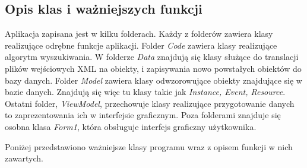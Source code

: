 \subsection{Opis klas i ważniejszych funkcji}

Aplikacja zapisana jest w kilku folderach. Każdy z folderów zawiera klasy realizujące odrębne funkcje aplikacji. Folder \textit{Code} zawiera klasy realizujące algorytm wyszukiwania.  W folderze \textit{Data} znajdują się klasy służące do translacji plików wejściowych XML na obiekty, i zapisywania nowo powstałych obiektów do bazy danych. Folder \textit{Model} zawiera klasy odwzorowujące obiekty znajdujące się w bazie danych. Znajdują się więc tu klasy takie jak \textit{Instance, Event, Resource}. Ostatni folder, \textit{ViewModel}, przechowuje klasy realizujące przygotowanie danych to zaprezentowania ich w interfejsie graficznym. Poza folderami znajduje się osobna klasa \textit{Form1}, która obsługuje interfejs graficzny użytkownika.

Poniżej przedstawiono ważniejsze klasy programu wraz z opisem funkcji w nich zawartych.

